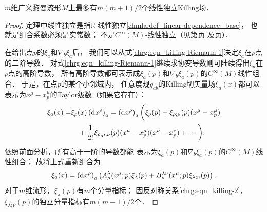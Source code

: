 \begin{theorem}\label{chrg:thm_killing-MAX}
    $m$维广义黎曼流形$M$上最多有$m(m+1)/2$个线性独立Killing场．
\end{theorem}
\begin{proof}
    定理中线性独立是指$\mathbb{R}$-线性独立\ref{chmla:def_linear-dependence_base}，
    也就是组合系数必须是实常数；
    不是$C^\infty(M)$-线性独立（见第\pageref{chdm:eqn_functimesv}页
    及\pageref{chdm:thm_Tensor-Characterization-Lemma}页）．

    在给出点$p$的$\xi_a$和$\nabla_b\xi_a$后，
    我们可以从式\eqref{chrg:eqn_killing-Riemann-1}决定$\xi_a$在$p$点的二阶导数．
    对式\eqref{chrg:eqn_killing-Riemann-1}继续求协变导数则可陆续得出$\xi_a$在$p$点的高阶导数，
    所有高阶导数都可表示成$\xi_a(p)$和$\nabla_b\xi_a(p)$的$C^\infty(M)$线性组合．
    于是，在点$p$的某个小邻域内，
    任意度规$g_{ab}$的Killing切矢量场$\xi_a(x)$都可以
    表示为$x^\mu-x^\mu_p$的Taylor级数（如果它存在）：
    \begin{align*}
        \xi_a(x)=&\xi_\rho(x) \left({\rm d}x^\rho\right)_a
        = \left({\rm d}x^\rho\right)_a \bigg( \xi_\rho(p)+
         \xi_{\rho;\mu}(p) (x^\mu -x_p^\mu) \\
        &\quad + \frac{1}{2!}\xi_{\rho;\mu;\nu}(p) (x^\mu -x_p^\mu)(x^\nu -x_p^\nu)
        +\cdots         \bigg).
    \end{align*}
    依照前面分析，所有高于一阶的导数都能
    表示为$\xi_a(p)$和$\nabla_b\xi_a(p)$的$C^\infty(M)$线性组合；
    故将上式重新组合为
    \begin{equation}\label{chrg:eqn_tmpkillnum}
        \xi_a(x)= \left({\rm d}x^\rho\right)_a
        \left(A_\rho^\lambda(x^\mu;p) \xi_\lambda(p)+
        B_\rho^{\lambda\nu}(x^\mu;p) \xi_{\lambda;\nu}(p) \right).
    \end{equation}
    对于$m$维流形，$\xi_\lambda(p)$有$m$个分量指标；
    因反对称关系\eqref{chrg:eqn_killing-2}，
    $\xi_{\lambda;\nu}(p)$的独立分量指标有$m(m-1)/2$个．


\end{proof}
